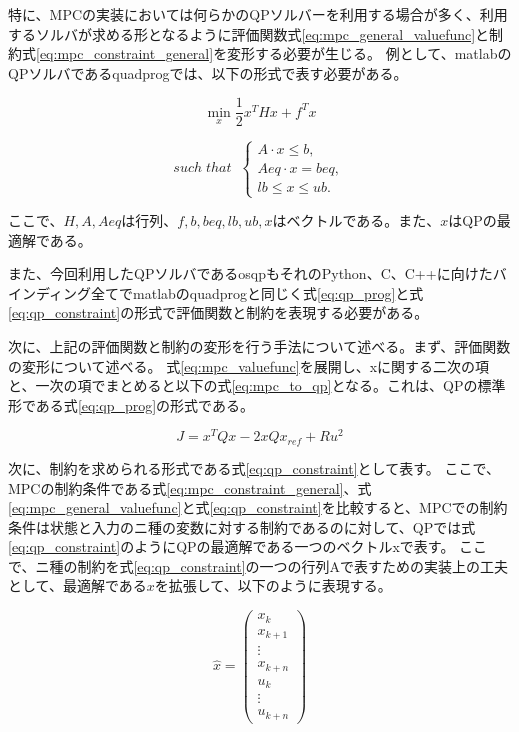 特に、MPCの実装においては何らかのQPソルバーを利用する場合が多く、利用するソルバが求める形となるように評価関数式\eqref{eq:mpc_general_valuefunc}と制約式\eqref{eq:mpc_constraint_general}を変形する必要が生じる。
例として、matlab\cite{MATLAB:2021}のQPソルバであるquadprog\cite{MATLABQUADPLOG}では、以下の形式で表す必要がある。

\begin{equation}
  \underset{x}{\min} \frac{1}{2}x^THx + f^Tx
  \label{eq:qp_prog}
\end{equation}

\begin{equation}
  such \; that \;\;
  \begin{cases}
    A \cdot x \leq b,  \\
    Aeq \cdot x = beq, \\
    lb \leq x \leq ub.
  \end{cases}
  \label{eq:qp_constraint}
\end{equation}

ここで、$H,A,Aeq$は行列、$f,b,beq,lb,ub,x$はベクトルである。また、$x$はQPの最適解である。

また、今回利用したQPソルバであるosqp\cite{OSQP}もそれのPython、C、C++に向けたバインディング全てでmatlabのquadprogと同じく式\eqref{eq:qp_prog}と式\eqref{eq:qp_constraint}の形式で評価関数と制約を表現する必要がある。

次に、上記の評価関数と制約の変形を行う手法について述べる。まず、評価関数の変形について述べる。
式\eqref{eq:mpc_valuefunc}を展開し、xに関する二次の項と、一次の項でまとめると以下の式\eqref{eq:mpc_to_qp}となる。これは、QPの標準形である式\eqref{eq:qp_prog}の形式である。

\begin{equation}
  J =  x^TQx - 2xQx_{ref} + Ru^2
  \label{eq:mpc_to_qp}
\end{equation}

次に、制約を求められる形式である式\eqref{eq:qp_constraint}として表す。
ここで、MPCの制約条件である式\eqref{eq:mpc_constraint_general}、式\eqref{eq:mpc_general_valuefunc}と式\eqref{eq:qp_constraint}を比較すると、MPCでの制約条件は状態と入力のニ種の変数に対する制約であるのに対して、QPでは式\eqref{eq:qp_constraint}のようにQPの最適解である一つのベクトルxで表す。
ここで、ニ種の制約を式\eqref{eq:qp_constraint}の一つの行列Aで表すための実装上の工夫として、最適解である$x$を拡張して、以下のように表現する。

\begin{equation}
  \hat{x} =
  \begin{pmatrix}
    x_{k} \\ x_{k+1} \\ \vdots \\ x_{k+n}
    \\
    u_{k} \\ \vdots \\ u_{k+n}
  \end{pmatrix}
  \label{eq:augment_vec}
\end{equation}

